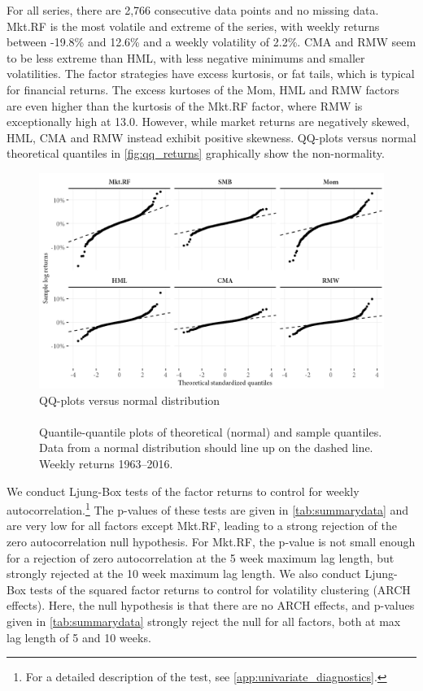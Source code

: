 For all series, there are 2,766 consecutive data points and no missing data. Mkt.RF is the most volatile and extreme of the series, with weekly returns between -19.8\% and 12.6\% and a weekly volatility of 2.2\%. CMA and RMW seem to be less extreme than HML, with less negative minimums and smaller volatilities. The factor strategies have excess kurtosis, or fat tails, which is typical for financial returns. The excess kurtoses of the Mom, HML and RMW factors are even higher than the kurtosis of the Mkt.RF factor, where RMW is exceptionally high at 13.0. However, while market returns are negatively skewed, HML, CMA and RMW instead exhibit positive skewness. QQ-plots versus normal theoretical quantiles in \autoref{fig:qq_returns} graphically show the non-normality.
\begin{figure}[htbp]
  \centering
  \footnotesize
  \renewcommand{\arraystretch}{1.2}
  \caption{QQ-plots versus normal distribution \\ \quad \\ 
  Quantile-quantile plots of theoretical (normal) and sample quantiles. Data from a normal distribution should line up on the dashed line. Weekly returns 1963--2016.}
  \label{fig:qq_returns}
  \includegraphics[scale=1]{graphics/qq_returns.png}
\end{figure}

We conduct Ljung-Box tests of the factor returns to control for weekly autocorrelation.\footnote{For a detailed description of the test, see \autoref{app:univariate_diagnostics}.} The p-values of these tests are given in \autoref{tab:summarydata} and are very low for all factors except Mkt.RF, leading to a strong rejection of the zero autocorrelation null hypothesis. For Mkt.RF, the p-value is not small enough for a rejection of zero autocorrelation at the 5 week maximum lag length, but strongly rejected at the 10 week maximum lag length. We also conduct Ljung-Box tests of the squared factor returns to control for volatility clustering (ARCH effects). Here, the null hypothesis is that there are no ARCH effects, and p-values given in \autoref{tab:summarydata} strongly reject the null for all factors, both at max lag length of 5 and 10 weeks.

